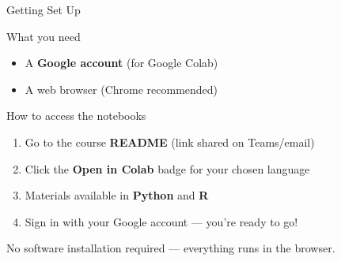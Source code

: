 \documentclass[aspectratio=169]{beamer}
\begin{document}
\begin{frame}{Getting Set Up}
    \begin{block}{What you need}
        \begin{itemize}
            \item A \textbf{Google account} (for Google Colab)
            \item A web browser (Chrome recommended)
        \end{itemize}
    \end{block}

    \begin{block}{How to access the notebooks}
        \begin{enumerate}
            \item Go to the course \textbf{README} (link shared on Teams/email)
            \item Click the \textbf{Open in Colab} badge for your chosen language
            \item Materials available in \textbf{Python} and \textbf{R}
            \item Sign in with your Google account --- you're ready to go!
        \end{enumerate}
    \end{block}

    \vspace{0.2cm}
    {\small {} No software installation required --- everything runs in the browser.}
\end{frame}
\end{document}
